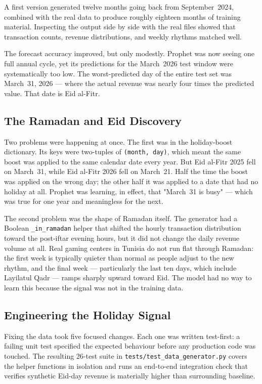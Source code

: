 A first version generated twelve months going back from September~2024,
combined with the real data to produce roughly eighteen months of training
material. Inspecting the output side by side with the real files showed that
transaction counts, revenue distributions, and weekly rhythms matched well.

The forecast accuracy improved, but only modestly. Prophet was now seeing one
full annual cycle, yet its predictions for the March~2026 test window were
systematically too low. The worst-predicted day of the entire test set was
March~31, 2026 --- where the actual revenue was nearly four times the predicted
value. That date is Eid al-Fitr.

\subsection{The Ramadan and Eid Discovery}

Two problems were happening at once. The first was in the holiday-boost
dictionary. Its keys were two-tuples of \texttt{(month, day)}, which meant
the same boost was applied to the same calendar date every year. But Eid al-Fitr
2025 fell on March~31, while Eid al-Fitr 2026 fell on March~21. Half the time
the boost was applied on the wrong day; the other half it was applied to a
date that had no holiday at all. Prophet was learning, in effect, that
"March~31 is busy" --- which was true for one year and meaningless for the
next.

The second problem was the shape of Ramadan itself. The generator had a
Boolean \texttt{\_in\_ramadan} helper that shifted the hourly transaction
distribution toward the post-iftar evening hours, but it did not change the
daily revenue volume at all. Real gaming centers in Tunisia do not run flat
through Ramadan: the first week is typically quieter than normal as people
adjust to the new rhythm, and the final week --- particularly the last ten
days, which include Layilatul Qadr --- ramps sharply upward toward Eid. The
model had no way to learn this because the signal was not in the training
data.

\subsection{Engineering the Holiday Signal}

Fixing the data took five focused changes. Each one was written test-first:
a failing unit test specified the expected behaviour before any production
code was touched. The resulting 26-test suite in
\texttt{tests/test\_data\_generator.py} covers the helper functions in
isolation and runs an end-to-end integration check that verifies synthetic
Eid-day revenue is materially higher than surrounding baseline.

